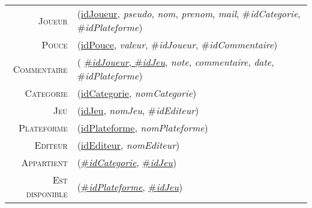 \documentclass{article}
\newenvironment{mld}
{\par\begin{minipage}{\linewidth}\begin{tabular}{rp{\linewidth}}}
{\end{tabular}\end{minipage}\par}
\newcommand{\relat}[1]{\textsc{#1}}
\newcommand{\attr}[1]{\emph{#1}}
\newcommand{\prim}[1]{\uline{#1}}
\newcommand{\foreign}[1]{\#\textsl{#1}}
\begin{document}
\begin{mld}
  \relat{Joueur} & (\prim{idJoueur}, \attr{pseudo}, \attr{nom}, \attr{prenom}, \attr{mail}, \foreign{idCategorie}, \foreign{idPlateforme})\\
  \relat{Pouce} & (\prim{idPouce}, \attr{valeur}, \foreign{idJoueur}, \foreign{idCommentaire})\\
  \relat{Commentaire} & ( \prim{\foreign{idJoueur}, \foreign{idJeu}}, \attr{note}, \attr{commentaire}, \attr{date}, \foreign{idPlateforme})\\
  \relat{Categorie} & (\prim{idCategorie}, \attr{nomCategorie})\\
  \relat{Jeu} & (\prim{idJeu}, \attr{nomJeu}, \foreign{idEditeur})\\
  \relat{Plateforme} & (\prim{idPlateforme}, \attr{nomPlateforme})\\
  \relat{Editeur} & (\prim{idEditeur}, \attr{nomEditeur})\\
  \relat{Appartient} & (\prim{\foreign{idCategorie}}, \prim{\foreign{idJeu}})\\
  \relat{Est disponible} & (\prim{\foreign{idPlateforme}}, \prim{\foreign{idJeu}})\\
\end{mld}
\end{document}
